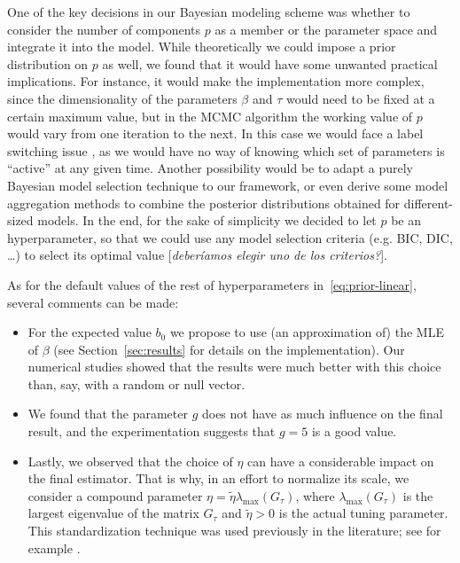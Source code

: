 \documentclass[ba]{imsart}
\numberwithin{equation}{section}
\theoremstyle{plain}
\newcommand\incomment[1]{\color{red}[\textit{#1}]\color{black}}
\begin{document}
One of the key decisions in our Bayesian modeling scheme was whether to consider the number of components \(p\) as a member or the parameter space and integrate it into the model. While theoretically we could impose a prior distribution on \(p\) as well, we found that it would have some unwanted practical implications. For instance, it would make the implementation more complex, since the dimensionality of the parameters \(\beta\) and \(\tau\) would need to be fixed at a certain maximum value, but in the MCMC algorithm the working value of \(p\) would vary from one iteration to the next. In this case we would face a label switching issue \citep[c.f.][Sec.~2.3]{grollemund2019bayesian}, as we would have no way of knowing which set of parameters is ``active'' at any given time. Another possibility would be to adapt a purely Bayesian model selection technique \citep[see][Ch.~7]{piironen2017comparison, gelman1995bayesian} to our framework, or even derive some model aggregation methods to combine the posterior distributions obtained for different-sized models. In the end, for the sake of simplicity we decided to let \(p\) be an hyperparameter, so that we could use any model selection criteria (e.g. BIC, DIC, \ldots) to select its optimal value \incomment{deberíamos elegir uno de los criterios?}.

As for the default values of the rest of hyperparameters in~\eqref{eq:prior-linear}, several comments can be made:
\begin{itemize}
  \item For the expected value \(b_0\) we propose to use (an approximation of) the MLE of \(\beta\) (see Section~\ref{sec:results} for details on the implementation). Our numerical studies showed that the results were much better with this choice than, say, with a random or null vector.
  \item We found that the parameter \(g\) does not have as much influence on the final result, and the experimentation suggests that \(g=5\) is a good value.
  \item Lastly, we observed that the choice of \(\eta\) can have a considerable impact on the final estimator. That is why, in an effort to normalize its scale, we consider a compound parameter \(\eta = \tilde \eta \lambda_{\max}(G_\tau)\), where \(\lambda_{\max}(G_\tau)\) is the largest eigenvalue of the matrix \(G_\tau\) and \(\tilde\eta > 0\) is the actual tuning parameter. This standardization technique was used previously in the literature; see for example \citet{grollemund2019bayesian}.
\end{itemize}
\end{document}
